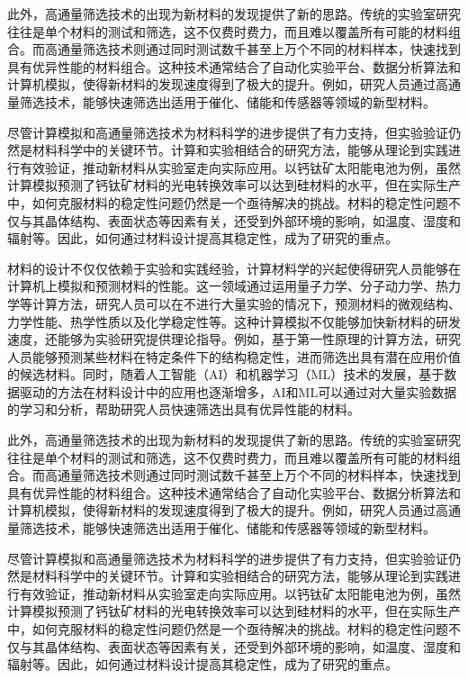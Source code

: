 \begin{multicols}{2}
此外，高通量筛选技术的出现为新材料的发现提供了新的思路。传统的实验室研究往往是单个材料的测试和筛选，这不仅费时费力，而且难以覆盖所有可能的材料组合。而高通量筛选技术则通过同时测试数千甚至上万个不同的材料样本，快速找到具有优异性能的材料组合。这种技术通常结合了自动化实验平台、数据分析算法和计算机模拟，使得新材料的发现速度得到了极大的提升。例如，研究人员通过高通量筛选技术，能够快速筛选出适用于催化、储能和传感器等领域的新型材料。

尽管计算模拟和高通量筛选技术为材料科学的进步提供了有力支持，但实验验证仍然是材料科学中的关键环节。计算和实验相结合的研究方法，能够从理论到实践进行有效验证，推动新材料从实验室走向实际应用。以钙钛矿太阳能电池为例，虽然计算模拟预测了钙钛矿材料的光电转换效率可以达到硅材料的水平，但在实际生产中，如何克服材料的稳定性问题仍然是一个亟待解决的挑战。材料的稳定性问题不仅与其晶体结构、表面状态等因素有关，还受到外部环境的影响，如温度、湿度和辐射等。因此，如何通过材料设计提高其稳定性，成为了研究的重点。

材料的设计不仅仅依赖于实验和实践经验，计算材料学的兴起使得研究人员能够在计算机上模拟和预测材料的性能。这一领域通过运用量子力学、分子动力学、热力学等计算方法，研究人员可以在不进行大量实验的情况下，预测材料的微观结构、力学性能、热学性质以及化学稳定性等。这种计算模拟不仅能够加快新材料的研发速度，还能够为实验研究提供理论指导。例如，基于第一性原理的计算方法，研究人员能够预测某些材料在特定条件下的结构稳定性，进而筛选出具有潜在应用价值的候选材料。同时，随着人工智能（AI）和机器学习（ML）技术的发展，基于数据驱动的方法在材料设计中的应用也逐渐增多，AI和ML可以通过对大量实验数据的学习和分析，帮助研究人员快速筛选出具有优异性能的材料。

此外，高通量筛选技术的出现为新材料的发现提供了新的思路。传统的实验室研究往往是单个材料的测试和筛选，这不仅费时费力，而且难以覆盖所有可能的材料组合。而高通量筛选技术则通过同时测试数千甚至上万个不同的材料样本，快速找到具有优异性能的材料组合。这种技术通常结合了自动化实验平台、数据分析算法和计算机模拟，使得新材料的发现速度得到了极大的提升。例如，研究人员通过高通量筛选技术，能够快速筛选出适用于催化、储能和传感器等领域的新型材料。

尽管计算模拟和高通量筛选技术为材料科学的进步提供了有力支持，但实验验证仍然是材料科学中的关键环节。计算和实验相结合的研究方法，能够从理论到实践进行有效验证，推动新材料从实验室走向实际应用。以钙钛矿太阳能电池为例，虽然计算模拟预测了钙钛矿材料的光电转换效率可以达到硅材料的水平，但在实际生产中，如何克服材料的稳定性问题仍然是一个亟待解决的挑战。材料的稳定性问题不仅与其晶体结构、表面状态等因素有关，还受到外部环境的影响，如温度、湿度和辐射等。因此，如何通过材料设计提高其稳定性，成为了研究的重点。

\end{multicols}

